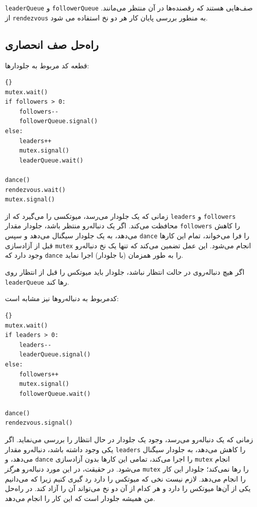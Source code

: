 \documentclass{book}
\newcommand{\clearemptydoublepage}{}%
\begin{document}
    \texttt{leaderQueue} و \texttt{followerQueue}
صف‌هایی هستند که رقصنده‌ها در آن  منتظر می‌مانند. 
    از \texttt{rendezvous}
    به منطور بررسی پایان کار هر دو نخ استفاده می شود. 

\clearemptydoublepage
\subsection {راه‌حل صف انحصاری}

    قطعه کد مربوط به جلو‌دارها:

\begin{latin}
\begin{lstlisting}[title=\rl{راه‌حل صف (جلودارها)}]{}
mutex.wait()
if followers > 0:
    followers--
    followerQueue.signal()
else:
    leaders++
    mutex.signal()
    leaderQueue.wait()    

dance()
rendezvous.wait()
mutex.signal()	
\end{lstlisting}
\end{latin}

    زمانی که یک جلو‌دار می‌رسد، میوتکسی را می‌گیرد که از \texttt{leaders} و \texttt{followers} محافظت می‌کند.
    اگر یک دنباله‌رو منتظر باشد، جلو‌دار مقدار {\tt followers} را کاهش می‌دهد،  به یک جلو‌دار سیگنال می‌دهد و سپس {\tt dance} را فرا می‌خواند، 
    تمام این‌ کارها  قبل از آزادسازی \texttt{mutex} انجام می‌شود. 
    این عمل تضمین می‌کند که تنها یک نخ دنباله‌رو وجود دارد که \texttt{dance} را به طور همزمان (با جلودار) اجرا نماید. 
    
    اگر هیچ دنباله‌روی در حالت انتظار نباشد، جلو‌دار باید میوتکس را قبل از انتظار روی \texttt{leaderQueue} رها کند. 

    کدمربوط به دنباله‌روها نیز مشابه است:

\begin{latin}
\begin{lstlisting}[title=\rl{راه‌حل صف (دنباله‌روها)}]{}
mutex.wait()
if leaders > 0:
    leaders--
    leaderQueue.signal()
else:
    followers++
    mutex.signal()
    followerQueue.wait()    

dance()
rendezvous.signal()
\end{lstlisting}
\end{latin}
    زمانی که یک دنباله‌رو می‌رسد، وجود یک جلودار در حال انتظار را بررسی می‌نماید. 
    اگر یکی وجود داشته باشد، دنباله‌رو مقدار {\tt leaders} را کاهش می‌دهد، به جلودار سیگنال می‌دهد، و {\tt dance} را اجرا می‌کند، 
    تمامی این‌ کارها بدون آزادسازی \texttt{mutex} انجام می‌شود. 
    در حقیقت، در این مورد دنباله‌رو {\em هرگز} {\tt mutex} را رها نمی‌کند؛‌ جلودار این کار را انجام می‌دهد. 
    لازم نیست نخی که میوتکس را دارد رد گیری کنیم زیرا که می‌دانیم یکی از آن‌ها میوتکس را دارد و هر کدام از آن دو نخ می‌تواند آن را آزاد کند. 
    در راه‌حل من همیشه جلودار است که این کار را انجام می‌دهد. 
    
\end{document}
